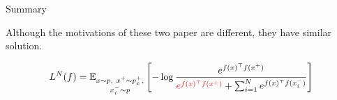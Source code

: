 \documentclass[aspectratio=169,mathserif]{beamer}  %
\newcommand{\E}{\mathbb{E}}
\newcommand{\red}{\textcolor{red}}
\begin{document}
\begin{frame}{Summary}

Although the motivations of these two paper are different, they have similar solution. 

\begin{eqnarray}
\begin{aligned}
L^N(f)=\E_{\substack{x\sim p,\ x^+\sim p_x^+,\\ x_i^-\sim p }}\left[-\log \frac{e^{f(x)^\top f(x^+)}}{\red{e^{f(x)^\top f(x^+)}}+ \sum_{i=1}^{N}e^{f(x)^\top f(x_i^-)}} \right]
\end{aligned}
\end{eqnarray}
    
\end{frame}
\end{document}
